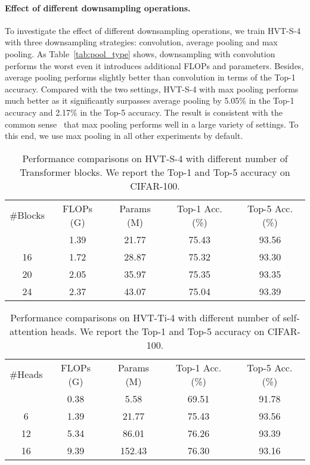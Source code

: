 \paragraph{Effect of different downsampling operations.}
To investigate the effect of different downsampling operations, we train HVT-S-4 with three downsampling strategies: convolution, average pooling and max pooling. 
As Table~\ref{tab:pool_type} shows, downsampling with convolution performs the worst even it introduces additional FLOPs and parameters. Besides, average pooling performs slightly better than convolution in terms of the Top-1 accuracy. Compared with the two settings, HVT-S-4 with max pooling performs much better as it significantly surpasses average pooling by 5.05\% in the Top-1 accuracy and 2.17\% in the Top-5 accuracy. The result is consistent with the common sense~\cite{pool_anly} that max pooling performs well in a large variety of settings. To this end, we use max pooling in all other experiments by default.




\begin{table}[]
\caption{
Performance comparisons on HVT-S-4 with different number of Transformer blocks. We report the Top-1 and Top-5 accuracy on CIFAR-100.
}
\vspace{-3pt}
\renewcommand\arraystretch{1.1}
\resizebox{\columnwidth}{!} {
\begin{tabular}{@{}ccc|cc@{}}
\#Blocks & FLOPs (G) & Params (M) & Top-1 Acc. (\%)  & Top-5 Acc. (\%) \\ \shline
12 & 1.39 & 21.77 & 75.43 & 93.56 \\ 
16 & 1.72 & 28.87 & 75.32 & 93.30 \\
20 & 2.05 & 35.97 & 75.35 & 93.35 \\
24 & 2.37 & 43.07 & 75.04 & 93.39 \\
\end{tabular}
}
\label{tab:num_blocks}
\vspace{-8pt}
\end{table}

\begin{table}[]
\centering
\caption{
Performance comparisons on HVT-Ti-4 with different number of self-attention heads. We report the Top-1 and Top-5 accuracy on CIFAR-100.
}
\vspace{-5pt}
\renewcommand\arraystretch{1.1}
\resizebox{\columnwidth}{!} {
\begin{tabular}{@{}ccc|cc@{}}
\#Heads & FLOPs (G) & Params (M) & Top-1 Acc. (\%)  & Top-5 Acc. (\%) \\ \shline
3 & 0.38 & 5.58 & 69.51 & 91.78 \\
6 & 1.39 & 21.77 & 75.43 & 93.56 \\
12 & 5.34 & 86.01 & 76.26 & 93.39 \\ 
16 & 9.39 & 152.43 & 76.30 & 93.16 \\ 
\end{tabular}
}
\label{tab:num_heads}
\vspace{-15pt}
\end{table}

